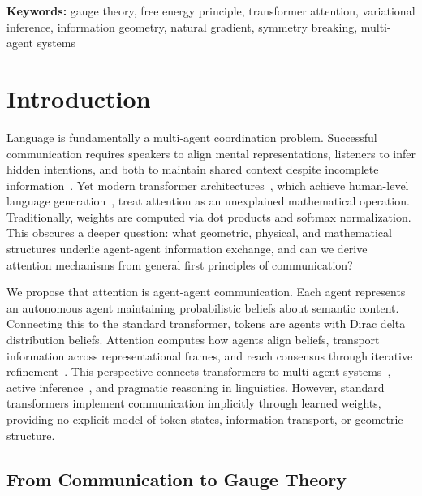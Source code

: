 \documentclass[twoside,11pt]{article}
\begin{document}
\noindent\textbf{Keywords:} gauge theory, free energy principle, transformer attention, variational inference, information geometry, natural gradient, symmetry breaking, multi-agent systems

\section{Introduction}

Language is fundamentally a multi-agent coordination problem. Successful communication requires speakers to align mental representations, listeners to infer hidden intentions, and both to maintain shared context despite incomplete information~\citep{wooldridge2009introduction,foerster2016learning}. Yet modern transformer architectures~\citep{vaswani2017attention}, which achieve human-level language generation~\citep{devlin2018bert,radford2019language}, treat attention as an unexplained mathematical operation. Traditionally, weights are computed via dot products and softmax normalization. This obscures a deeper question: what geometric, physical, and mathematical structures underlie agent-agent information exchange, and can we derive attention mechanisms from general first principles of communication?

We propose that attention is agent-agent communication. Each agent represents an autonomous agent maintaining probabilistic beliefs about semantic content. Connecting this to the standard transformer, tokens are agents with Dirac delta distribution beliefs. Attention computes how agents align beliefs, transport information across representational frames, and reach consensus through iterative refinement~\citep{sukhbaatar2016learning}. This perspective connects transformers to multi-agent systems~\citep{wooldridge2009introduction}, active inference~\citep{friston2010free,parr2022active}, and pragmatic reasoning in linguistics. However, standard transformers implement communication implicitly through learned weights, providing no explicit model of token states, information transport, or geometric structure. 

\subsection{From Communication to Gauge Theory}
\end{document}
